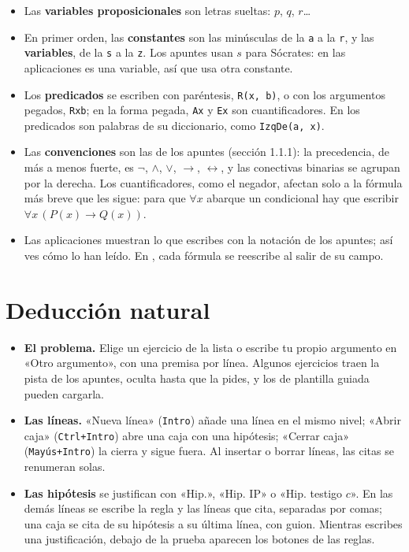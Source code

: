 \documentclass[a4paper,spanish,11pt]{article}
\newcommand{\tecla}[1]{\texttt{#1}}
\begin{document}
\begin{itemize}
    \item Las \textbf{variables proposicionales} son letras sueltas: $p$, $q$, $r$\dots
    \item En primer orden, las \textbf{constantes} son las minúsculas de la \tecla{a} a la \tecla{r}, y las \textbf{variables}, de la \tecla{s} a la \tecla{z}. Los apuntes usan $s$ para Sócrates: en las aplicaciones es una variable, así que usa otra constante.
    \item Los \textbf{predicados} se escriben con paréntesis, \tecla{R(x, b)}, o con los argumentos pegados, \tecla{Rxb}; en la forma pegada, \tecla{Ax} y \tecla{Ex} son cuantificadores. En \appmundo{} los predicados son palabras de su diccionario, como \tecla{IzqDe(a, x)}.
    \item Las \textbf{convenciones} son las de los apuntes (sección 1.1.1): la precedencia, de más a menos fuerte, es $\neg$, $\land$, $\lor$, $\to$, $\leftrightarrow$, y las conectivas binarias se agrupan por la derecha. Los cuantificadores, como el negador, afectan solo a la fórmula más breve que les sigue: para que $\forall x$ abarque un condicional hay que escribir $\forall x\, (P(x) \to Q(x))$.
    \item Las aplicaciones muestran lo que escribes con la notación de los apuntes; así ves cómo lo han leído. En \appdeduccion{}, cada fórmula se reescribe al salir de su campo.
\end{itemize}

\section{Deducción natural}

\begin{itemize}
    \item \textbf{El problema.} Elige un ejercicio de la lista o escribe tu propio argumento en «Otro argumento», con una premisa por línea. Algunos ejercicios traen la pista de los apuntes, oculta hasta que la pides, y los de plantilla guiada pueden cargarla.
    \item \textbf{Las líneas.} «Nueva línea» (\tecla{Intro}) añade una línea en el mismo nivel; «Abrir caja» (\tecla{Ctrl+Intro}) abre una caja con una hipótesis; «Cerrar caja» (\tecla{Mayús+Intro}) la cierra y sigue fuera. Al insertar o borrar líneas, las citas se renumeran solas.
    \item \textbf{Las hipótesis} se justifican con «Hip.», «Hip. IP» o «Hip. testigo $c$». En las demás líneas se escribe la regla y las líneas que cita, separadas por comas; una caja se cita de su hipótesis a su última línea, con guion. Mientras escribes una justificación, debajo de la prueba aparecen los botones de las reglas.
\end{itemize}
\end{document}
